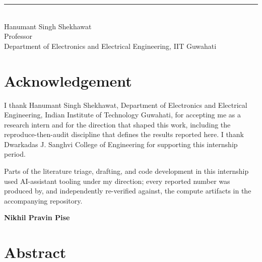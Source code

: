 \documentclass[11pt,a4paper]{report}
\begin{document}
\vspace{4em}
\begin{center}
\rule{0.35\textwidth}{0.4pt}\\[0.3em]
Hanumant Singh Shekhawat\\
Professor\\
Department of Electronics and Electrical Engineering, IIT Guwahati\\[1.5em]
\end{center}

\chapter*{Acknowledgement}
\thispagestyle{plain}

I thank Hanumant Singh Shekhawat, Department of Electronics and Electrical Engineering, Indian Institute of Technology
Guwahati, for accepting me as a research intern and for the direction that
shaped this work, including the reproduce-then-audit discipline that defines the
results reported here. I thank Dwarkadas J. Sanghvi College of Engineering for supporting this
internship period.

Parts of the literature triage, drafting, and code development in this
internship used AI-assistant tooling under my direction; every reported number
was produced by, and independently re-verified against, the compute artifacts
in the accompanying repository.

\begin{flushright}
\textbf{Nikhil Pravin Pise}\\
\end{flushright}

\chapter*{Abstract}
\thispagestyle{plain}
\end{document}
